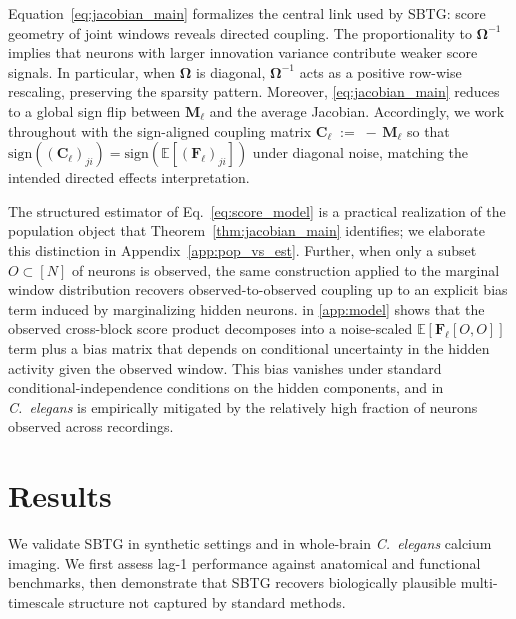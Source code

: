 \documentclass{article}
\theoremstyle{plain}
\theoremstyle{definition}
\theoremstyle{remark}
\newcommand{\E}{\mathbb{E}}
\newcommand{\1}{\mathbf{1}}
\begin{document}
Equation~\eqref{eq:jacobian_main} formalizes the central link used by SBTG: score geometry of joint windows reveals directed coupling. The proportionality to $\bm{\Omega}^{-1}$ implies that neurons with larger innovation variance contribute weaker score signals. In particular, when $\bm{\Omega}$ is diagonal, $\bm{\Omega}^{-1}$ acts as a positive row-wise rescaling, preserving the sparsity pattern. 
Moreover, \eqref{eq:jacobian_main} reduces to a global sign flip between $\bm{M}_\ell$ and the average Jacobian. Accordingly, we work throughout with the sign-aligned coupling matrix
$\bm{C}_\ell \;:=\; -\,\bm{M}_\ell$
so that $\mathrm{sign}((\bm{C}_\ell)_{ji}) = \mathrm{sign}(\E[(\bm{F}_\ell)_{ji}])$ under diagonal noise, matching the intended directed effects interpretation.

The structured estimator of Eq.~\eqref{eq:score_model} is a practical realization of the population object that Theorem~\ref{thm:jacobian_main} identifies; we elaborate this distinction in Appendix~\ref{app:pop_vs_est}. Further, when only a subset $O\subset[N]$ of neurons is observed, the same construction applied to the marginal window distribution recovers observed-to-observed coupling up to an explicit bias term induced by marginalizing hidden neurons.  in \cref{app:model} shows that the observed cross-block score product decomposes into a noise-scaled $\E[\bm{F}_\ell[O,O]]$ term plus a bias matrix that depends on conditional uncertainty in the hidden activity given the observed window. This bias vanishes under standard conditional-independence conditions on the hidden components, and in \emph{C.~elegans} is empirically mitigated by the relatively high fraction of neurons observed across recordings.



\section{Results}
\label{sec:results}

We validate SBTG in synthetic settings and in whole-brain \emph{C.~elegans} calcium imaging. We first assess lag-1 performance against anatomical and functional benchmarks, then demonstrate that SBTG recovers biologically plausible multi-timescale structure not captured by standard methods.
\end{document}
